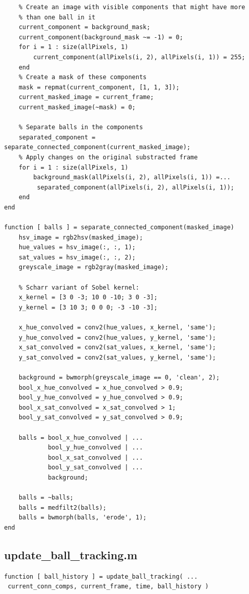 \documentclass[12pt,a4paper]{article}
\begin{document}
\begin{appendices}
\begin{verbatim}
    % Create an image with visible components that might have more 
    % than one ball in it
    current_component = background_mask;
    current_component(background_mask ~= -1) = 0;
    for i = 1 : size(allPixels, 1)
        current_component(allPixels(i, 2), allPixels(i, 1)) = 255;
    end
    % Create a mask of these components
    mask = repmat(current_component, [1, 1, 3]);
    current_masked_image = current_frame;
    current_masked_image(~mask) = 0;
        
    % Separate balls in the components
    separated_component = separate_connected_component(current_masked_image);
    % Apply changes on the original substracted frame
    for i = 1 : size(allPixels, 1)
        background_mask(allPixels(i, 2), allPixels(i, 1)) =...
         separated_component(allPixels(i, 2), allPixels(i, 1));
    end
end

function [ balls ] = separate_connected_component(masked_image)
    hsv_image = rgb2hsv(masked_image);
    hue_values = hsv_image(:, :, 1);
    sat_values = hsv_image(:, :, 2);
    greyscale_image = rgb2gray(masked_image);
  
    % Scharr variant of Sobel kernel:
    x_kernel = [3 0 -3; 10 0 -10; 3 0 -3]; 
    y_kernel = [3 10 3; 0 0 0; -3 -10 -3]; 
    
    x_hue_convolved = conv2(hue_values, x_kernel, 'same');
    y_hue_convolved = conv2(hue_values, y_kernel, 'same');
    x_sat_convolved = conv2(sat_values, x_kernel, 'same'); 
    y_sat_convolved = conv2(sat_values, y_kernel, 'same');
    
    background = bwmorph(greyscale_image == 0, 'clean', 2);
    bool_x_hue_convolved = x_hue_convolved > 0.9;
    bool_y_hue_convolved = y_hue_convolved > 0.9;
    bool_x_sat_convolved = x_sat_convolved > 1;
    bool_y_sat_convolved = y_sat_convolved > 0.9;
    
    balls = bool_x_hue_convolved | ...
            bool_y_hue_convolved | ...
            bool_x_sat_convolved | ...
            bool_y_sat_convolved | ...
            background;
      
    balls = ~balls;
    balls = medfilt2(balls);
    balls = bwmorph(balls, 'erode', 1);  
end
\end{verbatim}

\subsection{update\_ball\_tracking.m}

\begin{verbatim}
function [ ball_history ] = update_ball_tracking( ...
 current_conn_comps, current_frame, time, ball_history )


\end{verbatim}
\end{appendices}
\end{document}
